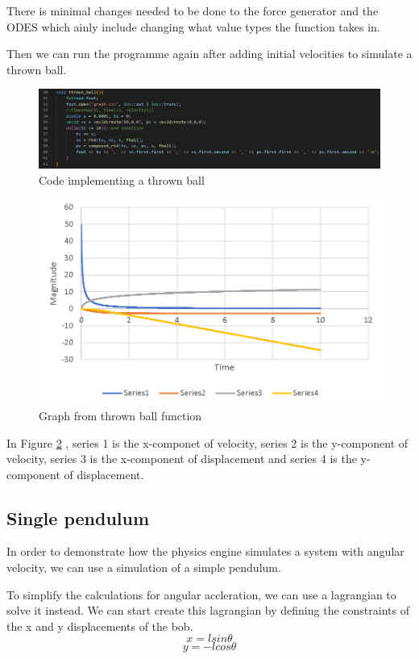 \documentclass[12pt, a2paper]{article}
\begin{document}
There is minimal changes needed to be done to the force generator and the ODES which ainly include changing what value types the function takes in.

Then we can run the programme again after adding initial velocities to simulate a thrown ball.
\begin{figure}[h]
\center
\includegraphics[width=1\textwidth]{thrown ball function}
\caption{Code implementing a thrown ball}
\label{fig 3}
\end{figure}
\begin{figure}[h]
\center
\includegraphics[width=1\textwidth]{thrown ball graph}
\caption{Graph from thrown ball function}
\label{Graph 2}
\end{figure}

In Figure \ref{Graph 2} , series 1 is the x-componet of velocity, series 2 is the y-component of velocity, series 3 is the x-component of displacement and series 4 is the y-component of displacement.
\pagebreak

\subsection{Single pendulum}
In order to demonstrate how the physics engine simulates a system with angular velocity, we can use a simulation of a simple pendulum. 

To simplify the calculations for angular accleration, we can use a lagrangian to solve it instead. We can start create this lagrangian by defining the constraints of the x and y displacements of the bob.
\[x = lsin\theta\]
\[y = -lcos\theta\]
\end{document}
